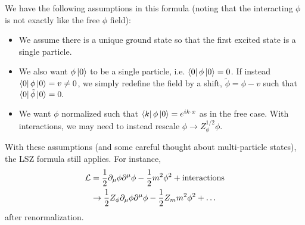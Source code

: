 We have the following assumptions in this formula (noting that the interacting $\phi$ is not exactly like the free $\phi$ field):
\begin{itemize}
    \item We assume there is a unique ground state so that the first excited state is a single particle.
    \item We also want $\phi\left| 0 \right>$ to be a single particle, i.e.
    $\left< 0 \right|\phi \left| 0 \right>=0$. If instead $\left< 0 \right|\phi\left| 0 \right>= v \neq 0$, we simply redefine the field by a shift, $\tilde \phi = \phi-v$ such that $\left< 0 \right|\tilde \phi\left| 0 \right>=0.$
    \item We want $\phi$ normalized such that $\left< k \right|\phi\left| 0 \right>=e^{ik\cdot x}$ as in the free case. With interactions, we may need to instead rescale $\phi \to Z_\phi^{1/2} \phi$. 
\end{itemize}
With these assumptions (and some careful thought about multi-particle states), the LSZ formula still applies. For instance,
\begin{align*}
    \mathcal L &= \frac{1}{2} \partial_\mu \phi \partial^\mu \phi -\frac{1}{2} m^2 \phi^2 +\text{interactions}\\
    &\to \frac{1}{2} Z_\phi \partial_\mu \phi \partial^\mu \phi-\frac{1}{2} Z_m m^2 \phi^2 +\ldots
\end{align*}
after renormalization.